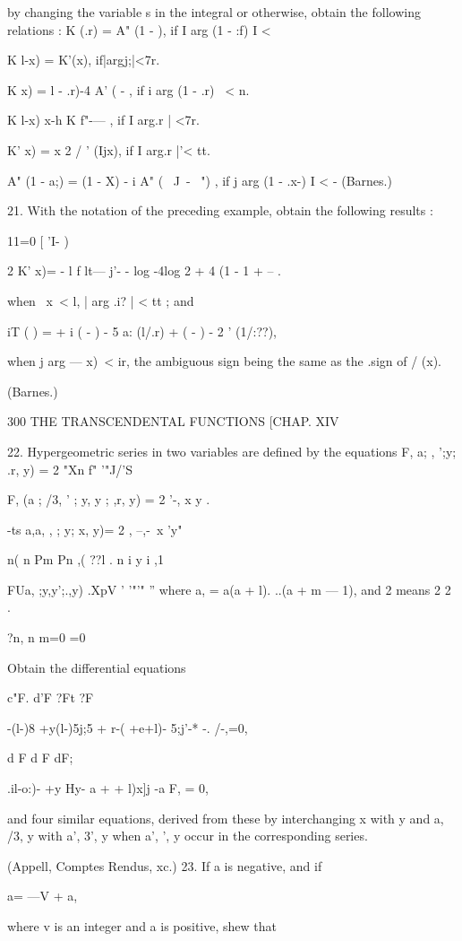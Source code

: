 by changing the variable s in the integral or otherwise, obtain the
following relations : K (.r) = A" (1 - ), if I arg (1 - :f) I <

K l-x) = K'(x), if|argj;|<7r.

K x) = l - .r)-4 A' ( - , if i arg (1 - .r) \ < n.

K l-x) x-h K f"-— , if I arg.r | <7r.

K' x) = x 2 / ' (Ijx), if I arg.r |'< tt.

A" (1 - a;) = (1 - X) - i A" ( \ J\ - \ ") , if j arg (1 - .x-) I < -
(Barnes.)

21. With the notation of the preceding example, obtain the following
results :

11=0 [ 'I- )

2 K' x)= - l f lt— j'- - log -4log 2 + 4 (1 - 1 + -- .

when \ x\ < l, | arg .i? | < tt ; and

iT ( ) = + i ( - ) - 5 a: (l/.r) + ( - ) - 2 ' (1/:??),

when j arg — x)\ < ir, the ambiguous sign being the same as the .sign
of / (x).

(Barnes.)

300 THE TRANSCENDENTAL FUNCTIONS [CHAP. XIV

22. Hypergeometric series in two variables are defined by the
equations F, a; , ';y; .r, y) = 2 "Xn f" '"J/'S

F, (a ; /3, ' ; y, y ; ,r, y) = 2 '-, x y .

-ts a,a, , ; y; x, y)= 2 , --,-\ x 'y"

 n( n Pm Pn ,( ??l . n i y i ,1

FUa, ;y,y';.,y) .XpV ' '"'" '' where a, = a(a + l). ..(a + m — 1), and
2 means 2 2 .

?n, n m=0 =0

Obtain the differential equations

c"F. d'F ?Ft ?F

-(l-)8 +y(l-)5j;5 + r-( +e+l)- 5;j'-* -. /-,=0,

d F d F dF;

.il-o:)- +y Hy- a + + l)x]j -a F, = 0,

and four similar equations, derived from these by interchanging x with
y and a, /3, y with a', 3', y when a', ', y occur in the corresponding
series.

(Appell, Comptes Rendus, xc.) 23. If a is negative, and if

a= —V + a,

where v is an integer and a is positive, shew that

